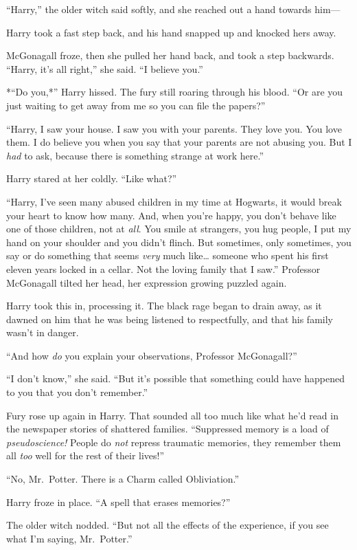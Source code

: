 ``Harry,'' the older witch said softly, and she reached out a hand
towards him---

Harry took a fast step back, and his hand snapped up and knocked hers
away.

McGonagall froze, then she pulled her hand back, and took a step
backwards. ``Harry, it's all right,'' she said. ``I believe you.''

*``Do you,*'' Harry hissed. The fury still roaring through his blood.
``Or are you just waiting to get away from me so you can file the
papers?''

``Harry, I saw your house. I saw you with your parents. They love you.
You love them. I do believe you when you say that your parents are not
abusing you. But I \emph{had} to ask, because there is something strange
at work here.''

Harry stared at her coldly. ``Like what?''

``Harry, I've seen many abused children in my time at Hogwarts, it would
break your heart to know how many. And, when you're happy, you don't
behave like one of those children, not at \emph{all}. You smile at
strangers, you hug people, I put my hand on your shoulder and you didn't
flinch. But sometimes, only sometimes, you say or do something that
seems \emph{very} much like\ldots{} someone who spent his first eleven
years locked in a cellar. Not the loving family that I saw.'' Professor
McGonagall tilted her head, her expression growing puzzled again.

Harry took this in, processing it. The black rage began to drain away,
as it dawned on him that he was being listened to respectfully, and that
his family wasn't in danger.

``And how \emph{do} you explain your observations, Professor
McGonagall?''

``I don't know,'' she said. ``But it's possible that something could
have happened to you that you don't remember.''

Fury rose up again in Harry. That sounded all too much like what he'd
read in the newspaper stories of shattered families. ``Suppressed memory
is a load of \emph{pseudoscience!} People do \emph{not} repress
traumatic memories, they remember them all \emph{too} well for the rest
of their lives!''

``No, Mr.~Potter. There is a Charm called Obliviation.''

Harry froze in place. ``A spell that erases memories?''

The older witch nodded. ``But not all the effects of the experience, if
you see what I'm saying, Mr.~Potter.''

